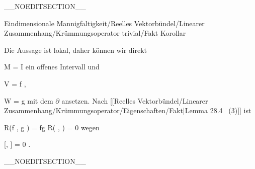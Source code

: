 __NOEDITSECTION__

{Eindimensionale Mannigfaltigkeit/Reelles Vektorbündel/Linearer Zusammenhang/Krümmungsoperator trivial/Fakt}
{Korollar}
{}
{

\faktzusatz {}
\faktzusatz {}

}
{

Die Aussage ist lokal, daher können wir direkt

\mavergleichskette
{\vergleichskette
{ M
}
{ = }{ I
}
{  }{
}
{    }{
}
{   }{
}
}
{}{}{}
ein offenes Intervall und

\mavergleichskette
{\vergleichskette
{ V
}
{ = }{ f \partial
}
{  }{
}
{    }{
}
{   }{
}
}
{}{}{,}

\mavergleichskette
{\vergleichskette
{ W
}
{ = }{ g \partial
}
{  }{
}
{    }{
}
{   }{
}
}
{}{}{}
mit dem
$\partial$ ansetzen. Nach
[[Reelles Vektorbündel/Linearer Zusammenhang/Krümmungsoperator/Eigenschaften/Fakt|Lemma 28.4  (3)]]
ist

\mavergleichskettedisp
{\vergleichskette
{ R(f \partial, g \partial)
}
{ =} { fg R( \partial, \partial)
}
{ =} { 0
}
{ } {
}
{ } {
}
}
{}{}{}
wegen

\mavergleichskette
{\vergleichskette
{ [\partial, \partial ]
}
{ = }{ 0
}
{  }{
}
{    }{
}
{   }{
}
}
{}{}{.}

}

__NOEDITSECTION__

